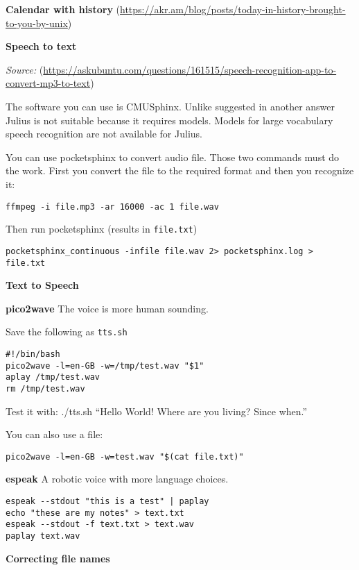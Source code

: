 \documentclass[]{book}
\theoremstyle{definition}
\theoremstyle{definition}
\theoremstyle{definition}
\theoremstyle{remark}
\begin{document}
\textbf{Calendar with history}
(\url{https://akr.am/blog/posts/today-in-history-brought-to-you-by-unix})

\textbf{Speech to text}

\emph{Source:}
(\url{https://askubuntu.com/questions/161515/speech-recognition-app-to-convert-mp3-to-text})

The software you can use is CMUSphinx. Unlike suggested in another
answer Julius is not suitable because it requires models. Models for
large vocabulary speech recognition are not available for Julius.

You can use pocketsphinx to convert audio file. Those two commands must
do the work. First you convert the file to the required format and then
you recognize it:

\begin{verbatim}
ffmpeg -i file.mp3 -ar 16000 -ac 1 file.wav
\end{verbatim}

Then run pocketsphinx (results in \texttt{file.txt})

\begin{verbatim}
pocketsphinx_continuous -infile file.wav 2> pocketsphinx.log > file.txt
\end{verbatim}

\textbf{Text to Speech}

\textbf{pico2wave} The voice is more human sounding.

Save the following as \texttt{tts.sh}

\begin{verbatim}
#!/bin/bash
pico2wave -l=en-GB -w=/tmp/test.wav "$1"
aplay /tmp/test.wav
rm /tmp/test.wav
\end{verbatim}

Test it with: ./tts.sh ``Hello World! Where are you living? Since
when.''

You can also use a file:

\begin{verbatim}
pico2wave -l=en-GB -w=test.wav "$(cat file.txt)"
\end{verbatim}

\textbf{espeak} A robotic voice with more language choices.

\begin{verbatim}
espeak --stdout "this is a test" | paplay
echo "these are my notes" > text.txt
espeak --stdout -f text.txt > text.wav
paplay text.wav
\end{verbatim}

\textbf{Correcting file names}
\end{document}
